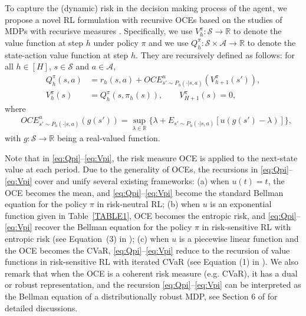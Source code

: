\documentclass[11pt]{article}
\newcommand{\1}{\mathbbm{1}}
\begin{document}
To capture the (dynamic) risk in the decision making process of the agent, we propose a novel RL formulation with recursive OCEs based on the studies of MDPs with recurisve measures \citep{ruszczynski2010risk,bauerle2022markov}. Specifically, we use $V_h^{\pi}:\mathcal{S}\to \mathbb{R}$ to denote the value function at step $h$ under policy $\pi$ and we use $Q_h^{\pi}:\mathcal{S}\times\mathcal{A}\to \mathbb{R}$ to denote the state-action value function at step $h$. They are recursively defined as follows: for all $ h \in [H]$, $s\in \mathcal{S}$ and $a \in \mathcal{A}$, 
\begin{align}
Q_h^{\pi}(s,a) & =r_h(s,a)+OCE^{u}_{s'\sim P_h(\cdot\vert s,a)}(V^{\pi}_{h+1}(s')), \label{eq:Qpi}\\
V_h^{\pi}(s) & =Q_h^{\pi}(s,\pi_h(s)), \quad \quad V_{H+1}^{\pi}(s) =0, \label{eq:Vpi}
\end{align}
where
\begin{equation}\label{OCES3}
\begin{aligned}
&OCE^{u}_{s'\sim P_h(\cdot\vert s,a)}( g(s'))=\sup_{\lambda\in \mathbb{R}}\{\lambda+E_{s'\sim P_{h}(\cdot\vert s,a)}[u(g(s')-\lambda)]\},
\end{aligned}
\end{equation} 
with $g:\mathcal{S} \rightarrow \mathbb{R}$ being a real-valued function. 


Note that in \eqref{eq:Qpi}--\eqref{eq:Vpi}, the risk measure OCE is applied to the next-state value at each period. 
Due to the generality of OCEs, the recursions in \eqref{eq:Qpi}--\eqref{eq:Vpi} cover and unify several existing frameworks: (a) when $u(t) = t$, the OCE becomes the mean, and \eqref{eq:Qpi}--\eqref{eq:Vpi} become the standard Bellman equation for the policy $\pi$ in risk-neutral RL; (b) when $u$ is an exponential function given in Table~\ref{TABLE1}, OCE becomes the entropic risk, and \eqref{eq:Qpi}--\eqref{eq:Vpi} recover the Bellman equation for the policy $\pi$ in risk-sensitive RL with entropic risk (see Equation~(3) in \cite{fei2021exponential}); (c) when $u$ is a piecewise linear function and the OCE becomes the CVaR, \eqref{eq:Qpi}--\eqref{eq:Vpi} reduce to the recursion of value functions in risk-sensitive RL with iterated CVaR (see Equation (1) in \cite{du2022risk}). We also remark that when the OCE is a coherent risk measure (e.g. CVaR), it has a dual or robust representation, and the recursion \eqref{eq:Qpi}--\eqref{eq:Vpi} can be interpreted as the Bellman equation of a distributionally robust MDP, see Section 6 of \cite{bauerle2022markov} for detailed discussions. 
\end{document}
